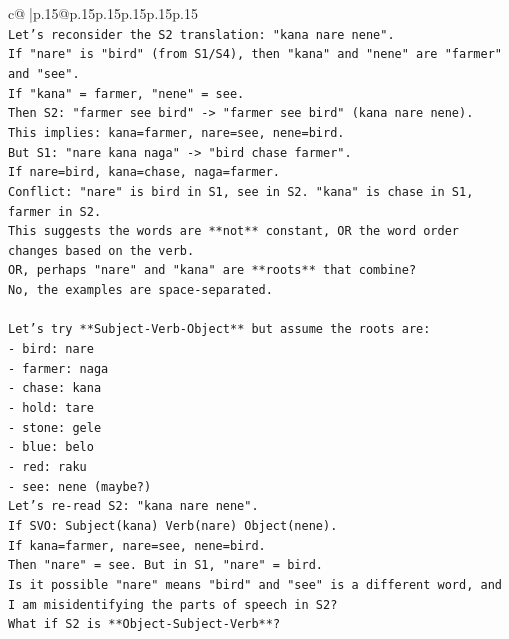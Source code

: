 \documentclass{article}
\begin{document}
{\begin{supertabular}{c@{$\;$}|p{.15\linewidth}@{}p{.15\linewidth}p{.15\linewidth}p{.15\linewidth}p{.15\linewidth}p{.15\linewidth}}
{{{\\ 
\texttt{Let's reconsider the S2 translation: "kana nare nene".} \\
\texttt{If "nare" is "bird" (from S1/S4), then "kana" and "nene" are "farmer" and "see".} \\
\texttt{If "kana" = farmer, "nene" = see.} \\
\texttt{Then S2: "farmer see bird" {-}> "farmer see bird" (kana nare nene).} \\
\texttt{This implies: kana=farmer, nare=see, nene=bird.} \\
\texttt{But S1: "nare kana naga" {-}> "bird chase farmer".} \\
\texttt{If nare=bird, kana=chase, naga=farmer.} \\
\texttt{Conflict: "nare" is bird in S1, see in S2. "kana" is chase in S1, farmer in S2.} \\
\texttt{This suggests the words are **not** constant, OR the word order changes based on the verb.} \\
\texttt{OR, perhaps "nare" and "kana" are **roots** that combine?} \\
\texttt{No, the examples are space{-}separated.} \\
\\ 
\texttt{Let's try **Subject{-}Verb{-}Object** but assume the roots are:} \\
\texttt{{-} bird: nare} \\
\texttt{{-} farmer: naga} \\
\texttt{{-} chase: kana} \\
\texttt{{-} hold: tare} \\
\texttt{{-} stone: gele} \\
\texttt{{-} blue: belo} \\
\texttt{{-} red: raku} \\
\texttt{{-} see: nene (maybe?)} \\
\texttt{Let's re{-}read S2: "kana nare nene".} \\
\texttt{If SVO: Subject(kana) Verb(nare) Object(nene).} \\
\texttt{If kana=farmer, nare=see, nene=bird.} \\
\texttt{Then "nare" = see. But in S1, "nare" = bird.} \\
\texttt{Is it possible "nare" means "bird" and "see" is a different word, and I am misidentifying the parts of speech in S2?} \\
\texttt{What if S2 is **Object{-}Subject{-}Verb**?} \\
}}}
\end{supertabular}}
\end{document}
